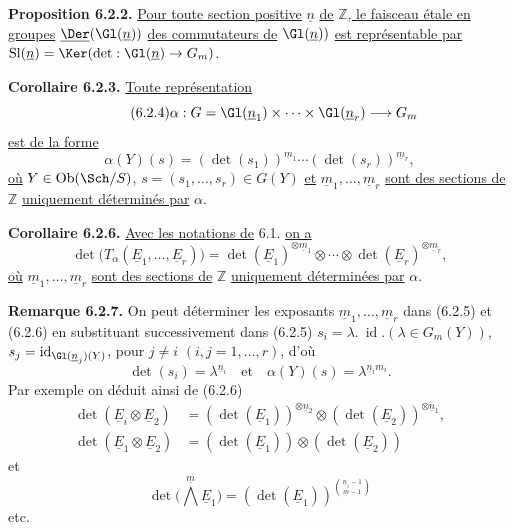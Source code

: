
\textbf{Proposition 6.2.2.} \uline{Pour toute section positive} \(\underline{n}\) \uline{de} \(\mathbb Z\)\uline{, le faisceau étale en groupes} \(\underline{\Der}(\Gl(\underline{n}))\) \uline{des commutateurs de} \(\Gl(\underline{n}))\) \uline{est représentable par}
\(\operatorname{Sl}(\underline{n})=\Ker(\det:\Gl(\underline{n})\to{G}_m)\).

\textbf{Corollaire 6.2.3.} \uline{Toute représentation}
\begin{equation}\tag{6.2.4}
 \alpha:G=\Gl(\underline{n}_1)\times\cdots\times\Gl(\underline{n}_r)\longrightarrow{G}_m
\end{equation}
\uline{est de la forme}
\begin{equation}\tag{6.2.5}
 \alpha(Y)(s)=(\det(s_1))^{\underline{m}_1}\cdots(\det(s_r))^{\underline{m}_r},
\end{equation}
\uline{où} \(Y\in\operatorname{Ob}(\Sch/S)\), \(s=(s_1,\ldots,s_r)\in G(Y)\) \uline{et} \(\underline{m}_1,\ldots,\underline{m}_r\) \uline{sont des sections de} \(\mathbb Z\) \uline{uniquement déterminés par} \(\alpha\).

\textbf{Corollaire 6.2.6.} \uline{Avec les notations de} 6.1. \uline{on a}
\[
 \det\bigl(T_\alpha(\underline{E}_1,\ldots,\underline{E}_r)\bigr)
 =
 \det(\underline{E}_1)^{\otimes \underline{m}_1}\otimes\cdots\otimes
 \det(\underline{E}_r)^{\otimes \underline{m}_r},
\]
\uline{où} \(\underline{m}_1,\ldots,\underline{m}_r\) \uline{sont des sections de} \(\mathbb Z\) \uline{uniquement déterminées par} \(\alpha\).

\textbf{Remarque 6.2.7.} On peut déterminer les exposants \(\underline{m}_1,\ldots,\underline{m}_r\) dans (6.2.5) et (6.2.6) en substituant successivement dans (6.2.5)
\(s_i=\lambda.\ \operatorname{id}.(\lambda\in{G}_m(Y))\), \(s_j=\operatorname{id}_{\Gl(\underline{n}_j)(Y)}\), pour \(j\ne i\) \((i,j=1,\ldots,r)\), d'où
\[
 \det(s_i)=\lambda^{\underline{n}_i}\quad\text{et}\quad
 \alpha(Y)(s)=\lambda^{\underline{n}_im_i}.
\]
Par exemple on déduit ainsi de (6.2.6)
\begin{align}
 \det(\underline{E}_i\otimes \underline{E}_2)&=(\det(\underline{E}_1))^{\otimes \underline{n}_2}\otimes(\det(\underline{E}_2))^{\otimes \underline{n}_1}, \tag{6.2.8}\\
 \det(\underline{E}_1\otimes \underline{E}_2)&=(\det(\underline{E}_1))\otimes(\det(\underline{E}_2)) \tag{6.2.9}
\end{align}
et
\begin{equation}\tag{6.2.10}
 \det\bigl(\bigwedge\limits^{\underline{m}} \underline{E}_1\bigr)=(\det(\underline{E}_1))^{\binom{\underline{n}_1-1}{\underline{m}-1}}
\end{equation}
etc.

